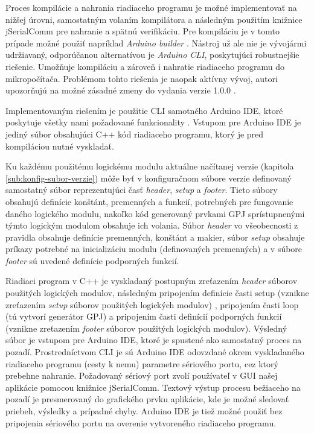 Proces kompilácie a nahrania riadiaceho programu je možné implementovať na nižšej úrovni, samostatným volaním kompilátora a následným použitím knižnice jSerialComm pre nahranie a spätnú verifikáciu. Pre kompiláciu je v tomto prípade možné použiť napríklad \textit{Arduino builder} \cite{arduinoBuilder}. Nástroj už ale nie je vývojármi udržiavaný, odporúčanou alternatívou je \textit{Arduino CLI}, poskytujúci robustnejšie riešenie. Umožňuje kompiláciu a zároveň i nahratie riadiaceho programu do mikropočítača. Problémom tohto riešenia je naopak aktívny vývoj, autori upozorňujú na možné zásadné zmeny do vydania verzie 1.0.0 \cite{arduinoCli}.

Implementovaným riešením je použitie CLI samotného Arduino IDE, ktoré poskytuje všetky nami požadované funkcionality \cite{arduinoIdeCli}. Vstupom pre Arduino IDE je jediný súbor obsahujúci C++ kód riadiaceho programu, ktorý je pred kompiláciou nutné vyskladať.

Ku každému použitému logickému modulu aktuálne načítanej verzie (kapitola \ref{sub:konfig-subor-verzie}) môže byť v konfiguračnom súbore verzie definovaný samostatný súbor reprezentujúci časť \textit{header}, \textit{setup} a \textit{footer}.  Tieto súbory obsahujú definície konštánt, premenných a funkcií, potrebných pre fungovanie daného logického modulu, nakoľko kód generovaný prvkami GPJ sprístupnenými týmto logickým modulom obsahuje ich volania. Súbor \textit{header} vo všeobecnosti z pravidla obsahuje definície premenných, konštánt a makier, súbor \textit{setup} obsahuje príkazy potrebné na  inicializáciu modulu (definovaných premenných) a v súbore \textit{footer} sú uvedené definície podporných funkcií.

Riadiaci program v C++ je vyskladaný postupným zreťazením \textit{header} súborov použitých logických modulov, následným pripojením definície časti setup (vznikne zreťazením \textit{setup} súborov použitých logických modulov) , pripojením časti loop (tú vytvorí generátor GPJ) a pripojením časti definícií podporných funkcií (vznikne zreťazením \textit{footer} súborov použitých logických modulov). Výsledný súbor je vstupom pre Arduino IDE, ktoré je spustené ako samostatný proces na pozadí. Prostredníctvom CLI je sú Arduino IDE odovzdané okrem vyskladaného riadiaceho programu (cesty k nemu) parametre sériového portu, cez ktorý prebehne nahranie. Požadovaný sériový port zvolí používateľ v GUI našej aplikácie pomocou knižnice jSerialComm. Textový výstup procesu bežiaceho na pozadí je presmerovaný do grafického prvku aplikácie, kde je možné sledovať priebeh, výsledky a prípadné chyby. Arduino IDE je tiež možné použiť bez pripojenia sériového portu na overenie vytvoreného riadiaceho programu.


